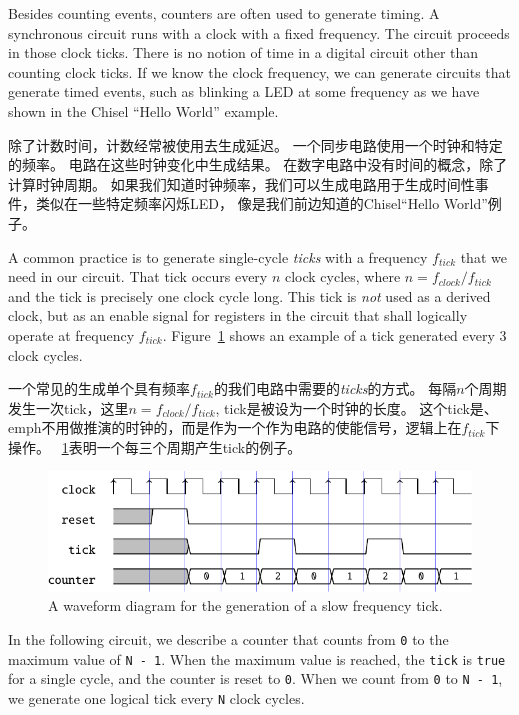 \documentclass[%
    10pt,
    headinclude, footexclude,
    openright, %
    notitlepage,
    cleardoubleempty,
    headsepline,
    pointlessnumbers,
    bibtotoc, idxtotoc,
    ]{scrbook}
\newcommand{\code}[1]{{\small{\texttt{#1}}}}
\begin{document}
Besides counting events, counters are often used to generate timing.
A synchronous circuit runs with a clock with a fixed frequency.
The circuit proceeds in those clock ticks. There is no notion of time in a digital
circuit other than counting clock ticks. If we know the clock frequency, we
can generate circuits that generate timed events, such as blinking a LED
at some frequency as we have shown in the Chisel ``Hello World'' example.

除了计数时间，计数经常被使用去生成延迟。
一个同步电路使用一个时钟和特定的频率。
电路在这些时钟变化中生成结果。
在数字电路中没有时间的概念，除了计算时钟周期。
如果我们知道时钟频率，我们可以生成电路用于生成时间性事件，类似在一些特定频率闪烁LED，
像是我们前边知道的Chisel``Hello World''例子。

A common practice is to generate single-cycle \emph{ticks} with a frequency $f_{tick}$
that we need in our circuit. That tick occurs every $n$ clock cycles,
where $n = f_{clock}/f_{tick}$ and the tick is precisely one clock cycle long.
This tick is \emph{not} used as a derived clock, but as an enable signal for
registers in the circuit that shall logically operate at frequency $f_{tick}$.
Figure~\ref{fig:tick-wave} shows an example of a tick generated every
3 clock cycles.

一个常见的生成单个具有频率$f_{tick}$的我们电路中需要的\emph{ticks}的方式。
每隔$n$个周期发生一次tick，这里$n = f_{clock}/f_{tick}$, tick是被设为一个时钟的长度。
这个tick是、emph{不}用做推演的时钟的，而是作为一个作为电路的使能信号，逻辑上在$f_{tick}$下操作。
~\ref{fig:tick-wave}表明一个每三个周期产生tick的例子。

\begin{figure}
  \centering
  \includegraphics[scale=1]{figures/tick_wave}
  \caption{A waveform diagram for the generation of a slow frequency tick.}
  \label{fig:tick-wave}
\end{figure}

In the following circuit, we describe a counter that counts from \code{0}
to the maximum value of \code{N - 1}. When the maximum value is reached,
the \code{tick} is \code{true} for a single cycle, and the counter is reset to \code{0}.
When we count from \code{0} to \code{N - 1}, we generate one logical tick
every \code{N} clock cycles.
\end{document}
